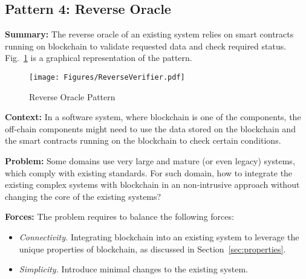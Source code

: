 
\subsection{ \textbf{Pattern 4: Reverse Oracle}} 
\label{sec:reverseverifier}

\noindent \textbf{Summary:} The reverse oracle of an existing system relies on smart contracts running on blockchain to validate requested data and check required status. Fig.~\ref{fig:reverseverifier} is a graphical representation of the pattern.

\begin{figure}[t]
\begin{center}
\texttt{[image: Figures/ReverseVerifier.pdf]}
\caption{Reverse Oracle Pattern}\label{fig:reverseverifier}
\end{center}
\end{figure}

\vspace{0.5em}\noindent \textbf{Context:} 
In a software system, where blockchain is one of the components, the off-chain components might need to use the data stored on the blockchain and the smart contracts running on the blockchain to check certain conditions.

\vspace{0.5em}\noindent \textbf{Problem:} 
Some domains use very large and mature (or even legacy) systems, which comply with existing standards. For such domain, how to integrate the existing complex systems with blockchain in an non-intrusive approach without changing the core of the existing systems?

\vspace{0.5em}\noindent \textbf{Forces:} The problem requires to balance the following forces:
\begin{itemize}
  \item \textit{Connectivity.} Integrating blockchain into an existing system to leverage the unique properties of blockchain, as discussed in Section~\ref{sec:properties}.
  \item \textit{Simplicity.} Introduce minimal changes to the existing system.
\end{itemize}

